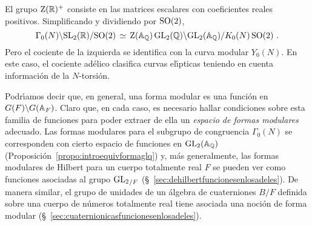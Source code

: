 %
El grupo $\mathrm{Z}(\mathbb{R})^{+}$ consiste en las matrices escalares con
coeficientes reales positivos. Simplificando y dividiendo por $\mathrm{SO}(2)$,
\begin{equation}
	\label{eq:curvamodularglqadeles}
	\Gamma_{0}(N)\backslash\mathrm{SL}_{2}(\mathbb{R})/\mathrm{SO}(2) \,\simeq\,
		\mathrm{Z}(\mathbb{A}_{\mathbb{Q}})\,\mathrm{GL}_{2}(\mathbb{Q})\backslash
			\mathrm{GL}_{2}(\mathbb{A}_{\mathbb{Q}})/K_{0}(N)\,\mathrm{SO}(2)
	\text{ .}
\end{equation}
%
Pero el cociente de la izquierda se identifica con la curva modular $Y_{0}(N)$.
En este caso, el cociente ad\'{e}lico clasifica curvas el\'{\i}pticas teniendo
en cuenta informaci\'{o}n de la $N$-torsi\'{o}n.

Podr\'{\i}amos decir que, en general, una forma modular es una funci\'{o}n en
$G(F)\backslash G(\mathbb{A}_{F})$. Claro que, en cada caso, es necesario hallar
condiciones sobre esta familia de funciones para poder extraer de ella un
\emph{espacio de formas modulares} adecuado.
Las formas modulares para el subgrupo de congruencia $\Gamma_{0}(N)$ se
corresponden con cierto espacio de funciones en $\mathrm{GL}_{2}(\mathbb{A}_{\mathbb{Q}})$
(Proposici\'{o}n~\ref{propo:introequivformaglq}) y, m\'{a}s generalmente, las
formas modulares de Hilbert para un cuerpo totalmente real $F$ se pueden ver
como funciones asociadas al grupo ${\mathrm{GL}_{2}}_{/F}$
(\S~\ref{sec:dehilbertfuncionesenlosadeles}). De manera similar, el grupo de
unidades de un \'{a}lgebra de cuaterniones $B/F$ definida sobre una cuerpo de
n\'{u}meros totalmente real tiene asociada una noci\'{o}n de forma modular
(\S~\ref{sec:cuaternionicasfuncionesenlosadeles}).

